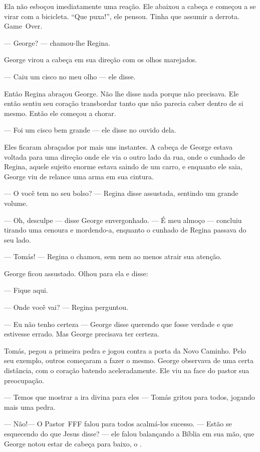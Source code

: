 Ela não esboçou imediatamente uma reação. Ele abaixou a cabeça e começou a se virar com a bicicleta. ``Que puxa!'', ele pensou. Tinha que assumir a derrota. \foreignlanguage{english}{Game~Over}.

--- George? --- chamou-lhe Regina.

George virou a cabeça em sua direção com os olhos marejados.

--- Caiu um cisco no meu olho --- ele disse.

Então Regina abraçou George. Não lhe disse nada\mudanca{,} porque não precisava. Ele então sentiu seu coração transbordar tanto que não parecia caber dentro de si mesmo. Então ele começou a chorar.

--- Foi um cisco bem grande --- ele disse no ouvido dela.

Eles ficaram abraçados por mais uns instantes. A cabeça de George estava voltada para uma direção onde ele via o outro lado da rua, onde o cunhado de Regina, aquele sujeito enorme\mudanca{,} estava saindo de um carro, e enquanto ele saia, George viu de relance uma arma em sua cintura.

--- O você tem no seu bolso? --- Regina disse assustada, sentindo um grande volume.

--- Oh, desculpe --- disse George\mudanca{,} envergonhado. --- É meu almoço --- concluiu tirando uma cenoura e mordendo-a, enquanto o cunhado de Regina passava do seu lado.

--- Tomás! --- Regina o chamou, sem nem ao menos atrair sua atenção.

George ficou assustado. Olhou para ela e disse:

--- Fique aqui.

--- Onde você vai? --- Regina perguntou.

--- Eu não tenho certeza --- George disse\mudanca{,} querendo que fosse verdade e que estivesse errado. Mas George precisava ter certeza.

Tomás, pegou a primeira pedra e jogou contra a porta da Novo Caminho. Pelo seu exemplo, outros começaram a fazer o mesmo. George observava de uma certa distância, com o coração batendo aceleradamente. Ele viu na face do pastor sua preocupação.

--- Temos que mostrar a ira divina para eles --- Tomás gritou para todos, jogando mais uma pedra.

--- Não!--- O Pastor~FFF falou para todos acalmá-los  sucesso. --- Estão se esquecendo do que Jesus disse? --- ele falou\mudanca{,} balançando a Bíblia em sua mão, que George notou estar de cabeça para baixo, o .

